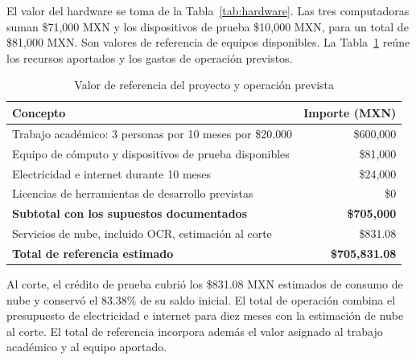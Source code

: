 El valor del hardware se toma de la Tabla~\ref{tab:hardware}. Las tres computadoras suman \$71{,}000 MXN y los dispositivos de prueba \$10{,}000 MXN, para un total de \$81{,}000 MXN. Son valores de referencia de equipos disponibles. La Tabla~\ref{tab:costos-total} reúne los recursos aportados y los gastos de operación previstos.

\begin{table}[H]
\centering
\caption{Valor de referencia del proyecto y operación prevista}
\label{tab:costos-total}
\begin{tabularx}{\textwidth}{|X|r|}
\hline
\textbf{Concepto} & \textbf{Importe (MXN)} \\ \hline
Trabajo académico: 3 personas por 10 meses por \$20{,}000 & \$600{,}000 \\ \hline
Equipo de cómputo y dispositivos de prueba disponibles & \$81{,}000 \\ \hline
Electricidad e internet durante 10 meses & \$24{,}000 \\ \hline
Licencias de herramientas de desarrollo previstas & \$0 \\ \hline
\textbf{Subtotal con los supuestos documentados} & \textbf{\$705{,}000} \\ \hline
Servicios de nube, incluido OCR, estimación al corte & \$831.08 \\ \hline
\textbf{Total de referencia estimado} & \textbf{\$705{,}831.08} \\ \hline
\end{tabularx}
\end{table}

Al corte, el crédito de prueba cubrió los \$831.08 MXN estimados de consumo de nube y conservó el 83.38\% de su saldo inicial. El total de operación combina el presupuesto de electricidad e internet para diez meses con la estimación de nube al corte. El total de referencia incorpora además el valor asignado al trabajo académico y al equipo aportado.
